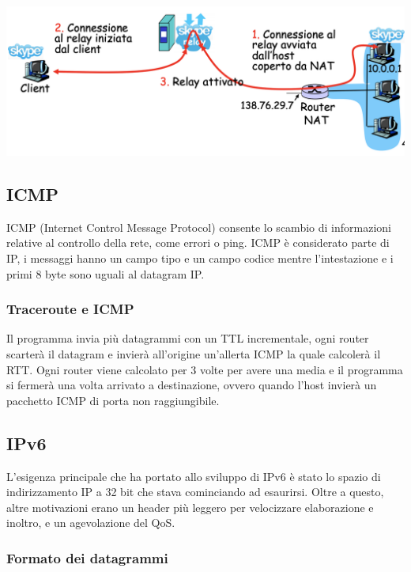 \documentclass{report}
\begin{document}
\begin{center}
		\includegraphics[width=0.7\linewidth]{skype}
	\end{center}

\hypertarget{header-n151}{%
\subsection{ICMP}\label{header-n151}}

ICMP (Internet Control Message Protocol) consente lo scambio di
informazioni relative al controllo della rete, come errori o ping. ICMP
è considerato parte di IP, i messaggi hanno un campo tipo e un campo
codice mentre l'intestazione e i primi 8 byte sono uguali al datagram
IP.

\hypertarget{header-n153}{%
\subsubsection{Traceroute e ICMP}\label{header-n153}}

Il programma invia più datagrammi con un TTL incrementale, ogni router
scarterà il datagram e invierà all'origine un'allerta ICMP la quale
calcolerà il RTT. Ogni router viene calcolato per 3 volte per avere una
media e il programma si fermerà una volta arrivato a destinazione,
ovvero quando l'host invierà un pacchetto ICMP di porta non
raggiungibile.

\hypertarget{header-n155}{%
\subsection{IPv6}\label{header-n155}}

L'esigenza principale che ha portato allo sviluppo di IPv6 è stato lo
spazio di indirizzamento IP a 32 bit che stava cominciando ad esaurirsi.
Oltre a questo, altre motivazioni erano un header più leggero per
velocizzare elaborazione e inoltro, e un agevolazione del QoS.

\hypertarget{header-n157}{%
\subsubsection{Formato dei datagrammi}\label{header-n157}}
\end{document}
